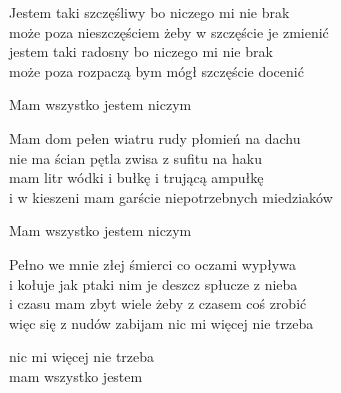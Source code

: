 \begin{text}
    Jestem taki szczęśliwy bo niczego mi nie brak\\
    może poza nieszczęściem żeby w szczęście je zmienić\\
    jestem taki radosny bo niczego mi nie brak\\
    może poza rozpaczą bym mógł szczęście docenić

    Mam wszystko jestem niczym

    Mam dom pełen wiatru rudy płomień na dachu\\
    nie ma ścian pętla zwisa z sufitu na haku\\
    mam litr wódki i bułkę i trującą ampułkę\\
    i w kieszeni mam garście niepotrzebnych miedziaków

    Mam wszystko jestem niczym

    Pełno we mnie złej śmierci co oczami wypływa\\
    i kołuje jak ptaki nim je deszcz spłucze z nieba\\
    i czasu mam zbyt wiele żeby z czasem coś zrobić\\
    więc się z nudów zabijam nic mi więcej nie trzeba

    nic mi więcej nie trzeba\\
    mam wszystko jestem
\end{text}
\begin{chord}

\end{chord}